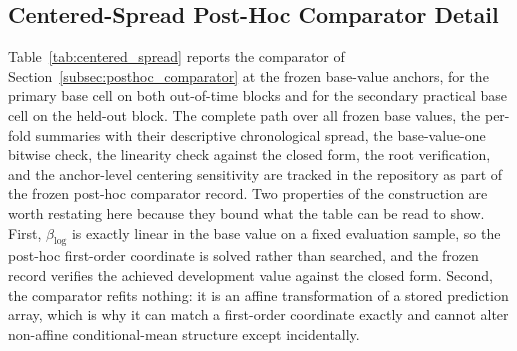 \documentclass[10pt]{article}
\theoremstyle{definition}
\newcommand{\1}{\mathbf{1}}
\begin{document}
\subsection{Centered-Spread Post-Hoc Comparator Detail}
\label{app:centered_spread_detail}

Table~\ref{tab:centered_spread} reports the comparator of
Section~\ref{subsec:posthoc_comparator} at the frozen base-value anchors, for the primary base cell
on both out-of-time blocks and for the secondary practical base cell on the held-out block. The
complete path over all frozen base values, the per-fold summaries with their descriptive
chronological spread, the base-value-one bitwise check, the linearity check against the closed form,
the root verification, and the anchor-level centering sensitivity are tracked in the repository as
part of the frozen post-hoc comparator record. Two properties of the construction are worth restating here because they bound what the
table can be read to show. First, $\beta_{\log}$ is exactly linear in the base value on a fixed
evaluation sample, so the post-hoc first-order coordinate is solved rather than searched, and the
frozen record verifies the achieved development value against the closed form. Second, the
comparator refits nothing: it is an affine transformation of a stored prediction array, which is why
it can match a first-order coordinate exactly and cannot alter non-affine conditional-mean
structure except incidentally.
\end{document}

